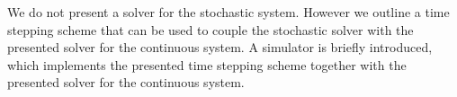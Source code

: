 We do not present a solver for the stochastic system. However we outline a time stepping scheme that can be used to couple the stochastic solver with the presented solver for the continuous system. A simulator \diffsim is briefly introduced, which implements the presented time stepping scheme together with the presented solver for the continuous system.
%
%
%
